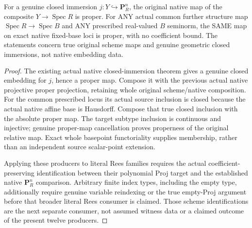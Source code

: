 \begin{theorem}
\label{scheme:native-closed-projective-map-proper}
For a genuine closed immersion $j:Y\hookrightarrow\mathbf P^n_R$, the original
native map of the composite $Y\to\operatorname{Spec}R$ is proper. For ANY actual
common further structure map $\operatorname{Spec}R\to\operatorname{Spec}B$ and
ANY prescribed real-valued $B$ seminorm, the SAME map on exact native fixed-base
loci is proper, with no coefficient bound. The statements concern true original
scheme maps and genuine geometric closed immersions, not native embedding data.
\leanok
\end{theorem}
\begin{proof}
The existing actual native closed-immersion theorem gives a genuine closed
embedding for $j$, hence a proper map. Compose it with the previous actual native
projective proper projection, retaining whole original scheme/native composition.
For the common prescribed locus its actual source inclusion is closed because
the actual native affine base is Hausdorff. Compose that true closed inclusion
with the absolute proper map. The target subtype inclusion is continuous and
injective; genuine proper-map cancellation proves properness of the original
relative map. Exact whole basepoint functoriality supplies membership, rather
than an independent source scalar-point extension.

Applying these producers to literal Rees families requires the actual
coefficient-preserving identification between their polynomial Proj target and
the established native $\mathbf P^n_R$ comparison. Arbitrary finite index types,
including the empty type, additionally require genuine variable reindexing or
the true empty-Proj argument before that broader literal Rees consumer is claimed.
Those scheme identifications are the next separate consumer, not assumed witness
data or a claimed outcome of the present twelve producers.
\end{proof}

